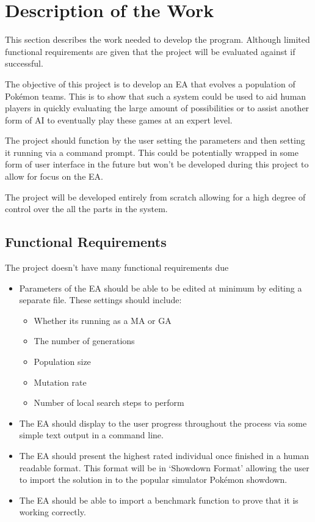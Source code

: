 \documentclass[a4paper]{article}
\newcommand{\Pokemon}{Pok\'{e}mon}
\begin{document}
\section{Description of the Work}
This section describes the work needed to develop the program.
Although limited functional requirements are given that the project will be evaluated against if successful.
\\ \par
The objective of this project is to develop an EA that evolves a population of \Pokemon{} teams.
This is to show that such a system could be used to aid human players in quickly evaluating the large amount of possibilities or to assist another form of AI to eventually play these games at an expert level.
\par
The project should function by the user setting the parameters and then setting it running via a command prompt.
This could be potentially wrapped in some form of user interface in the future but won't be developed during this project to allow for focus on the EA\@.
\par
The project will be developed entirely from scratch allowing for a high degree of control over the all the parts in the system.
\subsection{Functional Requirements}
The project doesn't have many functional requirements due
\begin{itemize}
	\item Parameters of the EA should be able to be edited at minimum by editing a separate file. These settings should include:
	\begin{itemize}
		\item Whether its running as a MA or GA
		\item The number of generations
		\item Population size
		\item Mutation rate
		\item Number of local search steps to perform
	\end{itemize}
	\item The EA should display to the user progress throughout the process via some simple text output in a command line.
	\item The EA should present the highest rated individual once finished in a human readable format. This format will be in `Showdown Format' allowing the user to import the solution in to the popular simulator \Pokemon{} showdown.
	\item The EA should be able to import a benchmark function to prove that it is working correctly.
\end{itemize}
\end{document}
